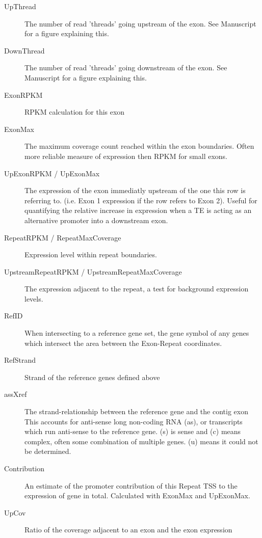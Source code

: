 \documentclass[11pt]{scrartcl}
\begin{document}
\begin{description}
\item[UpThread] The number of read 'threads' going upstream of the exon.
  See Manuscript for a figure explaining this.

\item[DownThread] The number of read 'threads' going downstream of the exon.
  See Manuscript for a figure explaining this.

\item[ExonRPKM] RPKM calculation for this exon

\item[ExonMax] The maximum coverage count reached within the exon boundaries. Often
  more reliable measure of expression then RPKM for small exons.

\item[UpExonRPKM / UpExonMax] The expression of the exon immediatly upstream of the
  one this row is referring to. (i.e. Exon 1 expression if the row refers
  to Exon 2). Useful for quantifying the relative increase in expression
  when a TE is acting as an alternative promoter into a downstream exon.

\item[RepeatRPKM / RepeatMaxCoverage]  Expression level within repeat boundaries.

\item[UpstreamRepeatRPKM / UpstreamRepeatMaxCoverage] The expression adjacent to the
  repeat, a test for background expression levels.

\item[RefID] When intersecting to a reference gene set, the gene symbol of any genes
  which intersect the area between the Exon-Repeat coordinates.

\item[RefStrand] Strand of the reference genes defined above

\item[assXref] The strand-relationship between the reference gene and the contig exon
  This accounts for anti-sense long non-coding RNA (as), or transcripts
  which run anti-sense to the reference gene. (s) is sense and (c) means
  complex, often some combination of multiple genes. (u) means it could not
  be determined.

\item[Contribution] An estimate of the promoter contribution of this Repeat TSS to
  the expression of gene in total. Calculated with ExonMax and UpExonMax.

\item[UpCov] Ratio of the coverage adjacent to an exon and the exon expression


\end{description}
\end{document}
